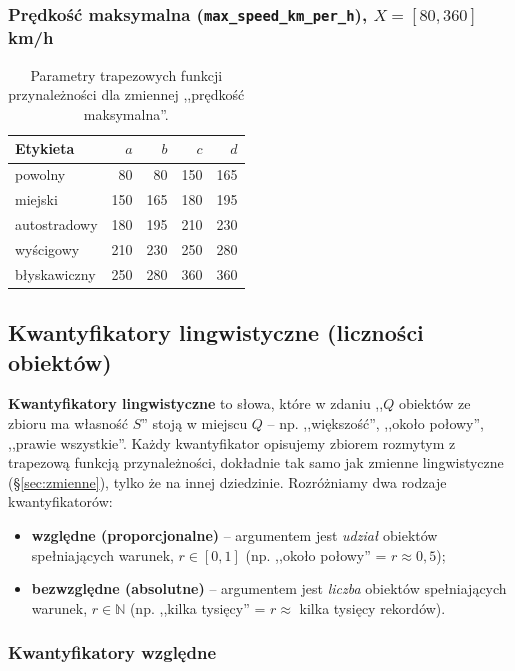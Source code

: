 \documentclass{article}
\begin{document}
\subsubsection{Prędkość maksymalna (\texttt{max\_speed\_km\_per\_h}), $X = [80, 360]$ km/h}
\begin{table}[H]
\centering
\caption{Parametry trapezowych funkcji przynależności dla zmiennej
,,prędkość maksymalna''.}
\label{tab:mf-vmax}
\begin{tabular}{l r r r r}
\toprule
Etykieta & $a$ & $b$ & $c$ & $d$ \\
\midrule
powolny       &  80 &  80 & 150 & 165 \\
miejski       & 150 & 165 & 180 & 195 \\
autostradowy  & 180 & 195 & 210 & 230 \\
wyścigowy     & 210 & 230 & 250 & 280 \\
błyskawiczny  & 250 & 280 & 360 & 360 \\
\bottomrule
\end{tabular}
\end{table}

\subsection{Kwantyfikatory lingwistyczne (liczności obiektów)}
\label{sec:quant}

\textbf{Kwantyfikatory lingwistyczne} to słowa, które w zdaniu
,,$Q$ obiektów ze zbioru ma własność $S$'' stoją w miejscu $Q$ --
np. ,,większość'', ,,około połowy'', ,,prawie wszystkie''. Każdy
kwantyfikator opisujemy zbiorem rozmytym z trapezową funkcją
przynależności, dokładnie tak samo jak zmienne lingwistyczne
(\S\ref{sec:zmienne}), tylko że na innej dziedzinie. Rozróżniamy
dwa rodzaje kwantyfikatorów:
\begin{itemize}
    \item \textbf{względne (proporcjonalne)} -- argumentem jest
    \emph{udział} obiektów spełniających warunek, $r \in [0,1]$
    (np. ,,około połowy'' = $r \approx 0{,}5$);
    \item \textbf{bezwzględne (absolutne)} -- argumentem jest
    \emph{liczba} obiektów spełniających warunek, $r \in \mathbb{N}$
    (np. ,,kilka tysięcy'' = $r \approx$ kilka tysięcy rekordów).
\end{itemize}

\subsubsection{Kwantyfikatory względne}
\end{document}

